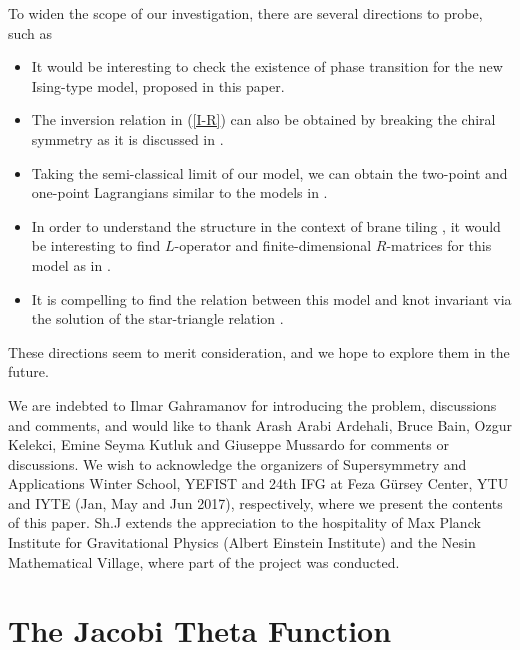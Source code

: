 \documentclass[a4paper,11pt]{article}%
\numberwithin{equation}{section}
\begin{document}
To widen the scope of our investigation, there are several directions to probe, such as
\begin{itemize}
\item It would be interesting to check the existence of phase transition for the new Ising-type model, proposed in this paper.

\item The inversion relation in (\ref{I-R}) can also be obtained by breaking the chiral symmetry as it is discussed in \cite{Spirdonov-2017}.

\item Taking the semi-classical limit of our  model, we can obtain the two-point and one-point Lagrangians similar to the  models in \cite{Bazhanov:2016ajm,Bazhanov:2010kz}.

\item In order to understand the structure in the context of brane tiling \cite{Yagi:2016oum}, it would be interesting to find $L$-operator and finite-dimensional $R$-matrices for this model as in \cite{Chicherin:2015mfv}.

\item It is compelling  to find the relation between this model and  knot invariant via the solution of the star-triangle relation \cite{article}.

\end{itemize}
These directions seem to merit consideration, and we hope to explore them in the future.

\acknowledgments
We are indebted to Ilmar Gahramanov for introducing the problem, discussions and comments, and would like to thank Arash Arabi Ardehali, Bruce Bain, Ozgur Kelekci, Emine Seyma Kutluk and Giuseppe Mussardo for comments or discussions. We wish to acknowledge the organizers of Supersymmetry and Applications Winter School, YEFIST and 24th IFG at Feza G\"{u}rsey Center, YTU and IYTE (Jan, May and Jun 2017), respectively, where we present the contents of this paper. Sh.J extends the appreciation to the hospitality of Max Planck Institute for Gravitational Physics (Albert Einstein Institute) and the Nesin Mathematical Village, where part of the project was conducted.





\appendix

\section{ The Jacobi Theta Function \label{appa} }  
\end{document}
